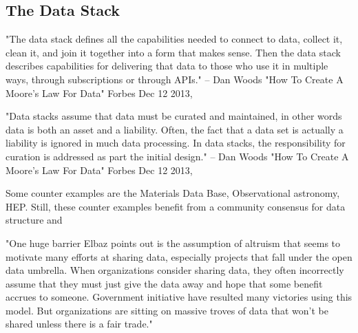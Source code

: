 \documentclass{article}
\begin{document}
\subsection{The Data Stack}

"The data stack defines all the capabilities needed to connect to data, collect it, clean it, and join it together into a form that makes sense.
Then the data stack describes capabilities for delivering that data to those who use it in multiple
ways, through subscriptions or through APIs." -- Dan Woods "How To Create A Moore's Law For Data" Forbes Dec 12 2013, \cite{Woods2013} %


"Data stacks assume that data must be curated and maintained, in other words data is both
an asset and a liability. Often, the fact that a data set is actually a liability is ignored in
much data processing. In data stacks, the responsibility for curation is addressed as part
the initial design." -- Dan Woods "How To Create A Moore's Law For Data" Forbes Dec 12 2013, \cite{Woods2013} %


Some counter examples are the Materials Data Base, Observational astronomy, HEP.  Still, these counter examples benefit from a community consensus for data structure and 







"One huge barrier Elbaz points out is the assumption of altruism that seems to motivate many
efforts at sharing data, especially projects that fall under the open data umbrella. When
organizations consider sharing data, they often incorrectly assume that they must just give the
data away and hope that some benefit accrues to someone. Government initiative have resulted
many victories using this model. But organizations are sitting on massive troves of data that
won’t be shared unless there is a fair trade."





\end{document}
